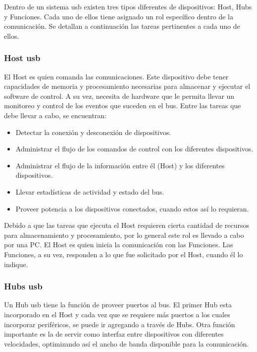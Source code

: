 Dentro de un sistema \acrshort{usb} existen tres tipos diferentes de dispositivos: Host, Hubs y Funciones. Cada uno de ellos tiene asignado un rol específico dentro de la comunicación. Se detallan a continuación las tareas pertinentes a cada uno de ellos.

\subsubsection{Host \acrshort{usb}}
	El Host es quien comanda las comunicaciones. Este dispositivo debe tener capacidades de memoria y procesamiento necesarias para almacenar y ejecutar el software de control. A su vez, necesita de hardware que le permita llevar un monitoreo y control de los eventos que suceden en el bus. Entre las tareas que debe llevar a cabo, se encuentran:
	
	\begin{itemize}
		\item Detectar la conexión y desconexión de dispositivos.
		\item Administrar el flujo de los comandos de control con los diferentes dispositivos.
		\item Administrar el flujo de la información entre él (Host) y los diferentes dispositivos.
		\item Llevar estadísticas de actividad y estado del bus.
		\item Proveer potencia a los dispositivos conectados, cuando estos así lo requieran.
	\end{itemize}
	
	Debido a que las tareas que ejecuta el Host requieren cierta cantidad de recursos para almacenamiento y procesamiento, por lo general este rol es llevado a cabo por una PC. El Host es quien inicia la comunicación con las Funciones. Las Funciones, a su vez, responden a lo que fue solicitado por el Host, cuando él lo indique.%
	
\subsubsection{Hubs \acrshort{usb}}
	Un Hub \acrshort{usb} tiene la función de proveer puertos al bus. El primer Hub esta incorporado en el Host y cada vez que se requiere más puertos a los cuales incorporar periféricos, se puede ir agregando a través de Hubs. Otra función importante es la de servir como interfaz entre dispositivos con diferentes velocidades, optimizando así el ancho de banda disponible para la comunicación.%
	
